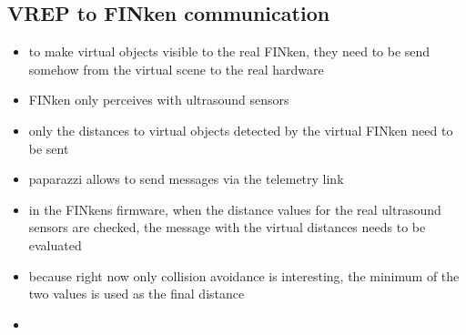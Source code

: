 \subsection{VREP to FINken communication}
\begin{itemize}
\item{to make virtual objects visible to the real FINken, they need to be send somehow from the virtual scene to the real hardware}
\item{FINken only perceives with ultrasound sensors}
\item{only the distances to virtual objects detected by the virtual FINken need to be sent}
\item{paparazzi allows to send messages via the telemetry link}
\item{in the FINkens firmware, when the distance values for the real ultrasound sensors are checked, the message with the virtual distances needs to be evaluated}
\item{because right now only collision avoidance is interesting, the minimum of the two values is used as the final distance}
\item{}
\end{itemize}
%
%
%

